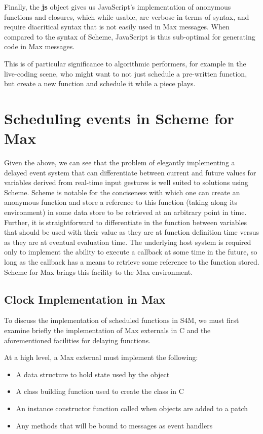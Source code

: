 \documentclass[acmsmall]{acmart}
\begin{document}
Finally, the \textbf{js} object gives us JavaScript's implementation of anonymous functions
and closures, which while usable, are verbose in terms of syntax, and require
diacritical syntax that is not easily used in Max messages. When compared to the syntax
of Scheme, JavaScript is thus sub-optimal for generating code in Max messages.

This is of particular significance to algorithmic performers, 
for example in the live-coding scene, who might
want to not just schedule a pre-written function, but create a new function 
and schedule it while a piece plays.


\section{Scheduling events in Scheme for Max}

Given the above, we can see that the problem of elegantly implementing 
a delayed event system that can differentiate between current and future values
for variables derived from real-time input gestures is well suited to solutions 
using Scheme. Scheme is notable for the conciseness with which one can create an anonymous function
and store a reference to this function (taking along its environment) in some data
store to be retrieved at an arbitrary point in time. Further, it is straightforward
to differentiate in the function between variables that should
be used with their value as they are at function definition time versus
as they are at eventual evaluation time. The underlying host system is required only to 
implement the ability to execute a callback at some time in the future, so long as 
the callback has a means to retrieve some reference to the function stored.
Scheme for Max brings this facility to the Max environment.


\subsection{Clock Implementation in Max}

To discuss the implementation of scheduled functions in S4M, we must first examine
briefly the implementation of Max externals in C and the aforementioned 
facilities for delaying functions.

At a high level, a Max external must implement the following:

\begin{itemize}
\item A data structure to hold state used by the object
\item A class building function used to create the class in C
\item An instance constructor function called when objects are added to a patch
\item Any methods that will be bound to messages as event handlers
\end{itemize}
\end{document}
